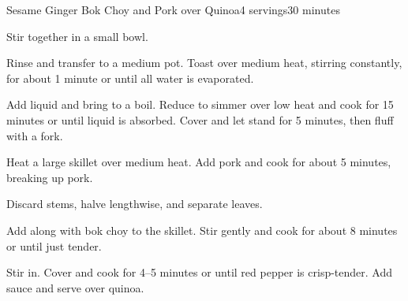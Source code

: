 \documentclass[../Cookbook.tex]{subfiles}
\begin{document}
\begin{recipe}{Sesame Ginger Bok Choy and Pork over Quinoa}{4 servings}{30 minutes}

Stir together in a small bowl.

Rinse and transfer to a medium pot. Toast over medium heat, stirring constantly, for about 1 minute or until all water is evaporated.

Add liquid and bring to a boil. Reduce to simmer over low heat and cook for 15 minutes or until liquid is absorbed. Cover and let stand for 5 minutes, then fluff with a fork.

Heat a large skillet over medium heat. Add pork and cook for about 5 minutes, breaking up pork.

Discard stems, halve lengthwise, and separate leaves.

Add along with bok choy to the skillet. Stir gently and cook for about 8 minutes or until just tender.

Stir in. Cover and cook for 4--5 minutes or until red pepper is crisp-tender. Add sauce and serve over quinoa.

\end{recipe}
\end{document}
